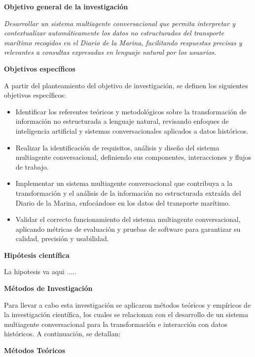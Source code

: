 \textbf{Objetivo general de la investigación}

\textit{Desarrollar un sistema multiagente conversacional que permita interpretar y contextualizar automáticamente los datos no estructurados del transporte marítimo recogidos en el Diario de la Marina, facilitando respuestas precisas y relevantes a consultas expresadas en lenguaje natural por los usuarios.}

\textbf{Objetivos específicos}

A partir del planteamiento del objetivo de investigación, se definen los siguientes objetivos específicos:
	\begin{itemize}
		\item Identificar los referentes teóricos y metodológicos sobre la transformación de información no estructurada a lenguaje natural, revisando enfoques de inteligencia artificial y sistemas conversacionales aplicados a datos históricos.
		\item Realizar la identificación de requisitos, análisis y diseño del sistema multiagente conversacional, definiendo sus componentes, interacciones y flujos de trabajo.
		\item Implementar un sistema multiagente conversacional que contribuya a la transformación y el análisis de la información no estructurada extraída del Diario de la Marina, enfocándose en los datos del transporte marítimo.
		\item Validar el correcto funcionamiento del sistema multiagente conversacional, aplicando métricas de evaluación y pruebas de software para garantizar su calidad, precisión y usabilidad.
	\end{itemize}
	
\textbf{Hipótesis científica}

La hipotesis va aqui .....

\textbf{Métodos de Investigación}
	
	Para llevar a cabo esta investigación se aplicaron métodos teóricos y empíricos de la investigación científica, los cuales se relacionan con el desarrollo de un sistema multiagente conversacional para la transformación e interacción con datos históricos. A continuación, se detallan:
	
\textbf{Métodos Teóricos}
	

